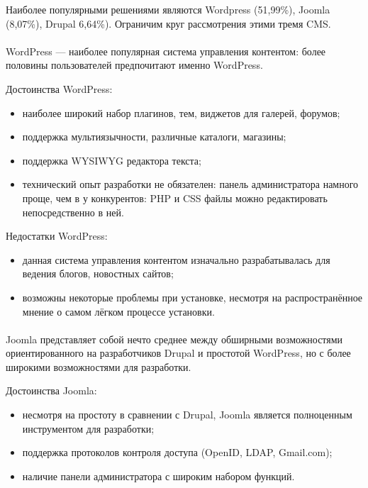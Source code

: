 Наиболее популярными решениями являются Wordpress (51{,}99\%), Joomla (8{,}07\%), Drupal 6{,}64\%).
Ограничим круг рассмотрения этими тремя CMS.

\paragraph{}
WordPress --- наиболее популярная система управления контентом:
более половины пользователей предпочитают именно WordPress.

Достоинства WordPress:
\begin{itemize}
\item
  наиболее широкий набор плагинов, тем, виджетов для галерей, форумов;
\item
  поддержка мультиязычности, различные каталоги, магазины;
\item
  поддержка WYSIWYG редактора текста;
\item
  технический опыт разработки не обязателен: панель администратора намного проще, чем в у конкурентов:
  PHP и CSS файлы можно редактировать непосредственно в ней.
\end{itemize}

Недостатки WordPress:
\begin{itemize}
\item
  данная система управления контентом изначально разрабатывалась для
  ведения блогов, новостных сайтов; 
\item
  возможны некоторые проблемы при установке,
  несмотря на распространённое мнение о самом лёгком процессе установки.
\end{itemize}

\paragraph{} 
Joomla представляет собой нечто среднее между обширными возможностями
ориентированного на разработчиков Drupal и простотой WordPress,
но с более широкими возможностями для разработки.

Достоинства Joomla:
\begin{itemize}
\item
  несмотря на простоту в сравнении с Drupal, Joomla является полноценным инструментом для разработки;
\item
  поддержка протоколов контроля доступа (OpenID, LDAP, Gmail.com);
\item
  наличие панели администратора с широким набором функций.
\end{itemize}

